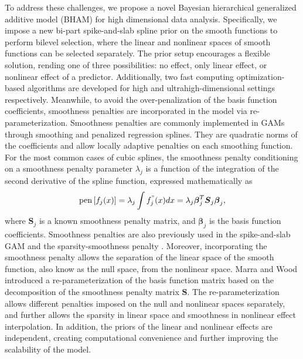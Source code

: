 \documentclass[AMA,STIX1COL,]{WileyNJD-v2}
\begin{document}
To address these challenges, we propose a novel Bayesian hierarchical
generalized additive model (BHAM) for high dimensional data analysis.
Specifically, we impose a new bi-part spike-and-slab spline prior on the
smooth functions to perform bilevel selection, where the linear and
nonlinear spaces of smooth functions can be selected separately. The
prior setup encourages a flexible solution, rending one of three
possibilities: no effect, only linear effect, or nonlinear effect of a
predictor. Additionally, two fast computing optimization-based
algorithms are developed for high and
ultrahigh-dimensional\citep{Fan2009} settings respectively. Meanwhile,
to avoid the over-penalization of the basis function coefficients,
smoothness penalties are incorporated in the model via
re-parameterization. Smoothness penalties are commonly implemented in
GAMs through smoothing and penalized regression splines. They are
quadratic norms of the coefficients and allow locally adaptive penalties
on each smoothing function. For the most common cases of cubic splines,
the smoothness penalty conditioning on a smoothness penalty parameter
\(\lambda_j\) is a function of the integration of the second derivative
of the spline function, expressed mathematically as
\begin{equation}\label{eq:smoothpen}
  \text{pen}\left[f_j(x)\right] = \lambda_j \int f^{"}_j(x)dx = \lambda_j \boldsymbol{\beta}_j^T \boldsymbol{S}_j \boldsymbol{\beta}_j ,
\end{equation} where \(\boldsymbol{S}_j\) is a known smoothness penalty
matrix, and \(\boldsymbol{\beta}_j\) is the basis function coefficients.
Smoothness penalties are also previously used in the spike-and-slab GAM
\citep{Scheipl2012} and the sparsity-smoothness penalty
\citep{Meier2009}. Moreover, incorporating the smoothness penalty allows
the separation of the linear space of the smooth function, also know as
the null space, from the nonlinear space. Marra and Wood
\citep{Marra2011} introduced a re-parameterization of the basis function
matrix based on the decomposition of the smoothness penalty matrix
\(\boldsymbol{S}\). The re-parameterization allows different penalties
imposed on the null and nonlinear spaces separately, and further allows
the sparsity in linear space and smoothness in nonlinear effect
interpolation. In addition, the priors of the linear and nonlinear
effects are independent, creating computational convenience and further
improving the scalability of the model.
\end{document}

